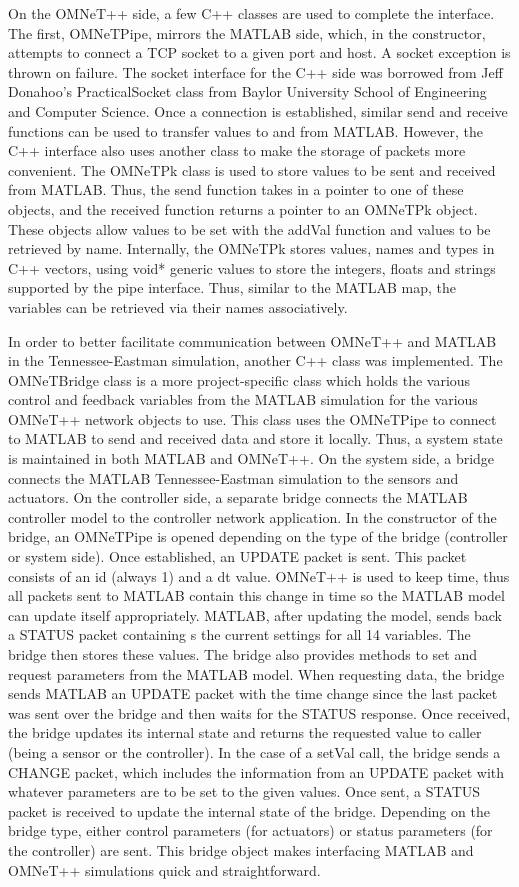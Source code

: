 On the OMNeT++ side, a few C++ classes are used to complete the interface. The first, OMNeTPipe, mirrors the MATLAB side, which, in the constructor, attempts to connect a TCP socket to a given port and host. A socket exception is thrown on failure. The socket interface for the C++ side was borrowed from Jeff Donahoo's PracticalSocket class from Baylor University School of Engineering and Computer Science. Once a connection is established, similar send and receive functions can be used to transfer values to and from MATLAB. However, the C++ interface also uses another class to make the storage of packets more convenient. The OMNeTPk class is used to store values to be sent and received from MATLAB. Thus, the send function takes in a pointer to one of these objects, and the received function returns a pointer to an OMNeTPk object. These objects allow values to be set with the addVal function and values to be retrieved by name. Internally, the OMNeTPk stores values, names and types in C++ vectors, using void* generic values to store the integers, floats and strings supported by the pipe interface. Thus, similar to the MATLAB map, the variables can be retrieved via their names associatively.

In order to better facilitate communication between OMNeT++ and MATLAB in the Tennessee-Eastman simulation, another C++ class was implemented. The OMNeTBridge class is a more project-specific class which holds the various control and feedback variables from the MATLAB simulation for the various OMNeT++ network objects to use. This class uses the OMNeTPipe to connect to MATLAB to send and received data and store it locally. Thus, a system state is maintained in both MATLAB and OMNeT++. On the system side, a bridge connects the MATLAB Tennessee-Eastman simulation to the sensors and actuators. On the controller side, a separate bridge connects the MATLAB controller model to the controller network application. In the constructor of the bridge, an OMNeTPipe is opened depending on the type of the bridge (controller or system side). Once established, an UPDATE packet is sent. This packet consists of an id (always 1) and a dt value. OMNeT++ is used to keep time, thus all packets sent to MATLAB contain this change in time so the MATLAB model can update itself appropriately. MATLAB, after updating the model, sends back a STATUS packet containing s the current settings for all 14 variables. The bridge then stores these values. The bridge also provides methods to set and request parameters from the MATLAB model. When requesting data, the bridge sends MATLAB an UPDATE packet with the time change since the last packet was sent over the bridge and then waits for the STATUS response. Once received, the bridge updates its internal state and returns the requested value to caller (being a sensor or the controller). In the case of a setVal call, the bridge sends a CHANGE packet, which includes the information from an UPDATE packet with whatever parameters are to be set to the given values. Once sent, a STATUS packet is received to update the internal state of the bridge. Depending on the bridge type, either control parameters (for actuators) or status parameters (for the controller) are sent. This bridge object makes interfacing MATLAB and OMNeT++ simulations quick and straightforward.